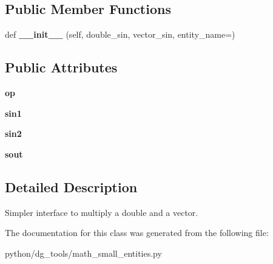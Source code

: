 \subsection*{Public Member Functions}
\begin{DoxyCompactItemize}
\item 
def {\bfseries \+\_\+\+\_\+init\+\_\+\+\_\+} (self, double\+\_\+sin, vector\+\_\+sin, entity\+\_\+name=\textquotesingle{}\textquotesingle{})\hypertarget{classpython_1_1dg__tools_1_1math__small__entities_1_1MultiplyDoubleVector_a686fa93d5e4eb5715a0e945b7f74eebd}{}\label{classpython_1_1dg__tools_1_1math__small__entities_1_1MultiplyDoubleVector_a686fa93d5e4eb5715a0e945b7f74eebd}

\end{DoxyCompactItemize}
\subsection*{Public Attributes}
\begin{DoxyCompactItemize}
\item 
{\bfseries op}\hypertarget{classpython_1_1dg__tools_1_1math__small__entities_1_1MultiplyDoubleVector_a457e6937d9762373d4e1442ef0f8063a}{}\label{classpython_1_1dg__tools_1_1math__small__entities_1_1MultiplyDoubleVector_a457e6937d9762373d4e1442ef0f8063a}

\item 
{\bfseries sin1}\hypertarget{classpython_1_1dg__tools_1_1math__small__entities_1_1MultiplyDoubleVector_ab9af832a8c134bf03fca80168dbe757b}{}\label{classpython_1_1dg__tools_1_1math__small__entities_1_1MultiplyDoubleVector_ab9af832a8c134bf03fca80168dbe757b}

\item 
{\bfseries sin2}\hypertarget{classpython_1_1dg__tools_1_1math__small__entities_1_1MultiplyDoubleVector_aed7cf50295ab6be0381522a8bbd7a637}{}\label{classpython_1_1dg__tools_1_1math__small__entities_1_1MultiplyDoubleVector_aed7cf50295ab6be0381522a8bbd7a637}

\item 
{\bfseries sout}\hypertarget{classpython_1_1dg__tools_1_1math__small__entities_1_1MultiplyDoubleVector_ac06f0ebb1bbda12565e5d33bb634cee2}{}\label{classpython_1_1dg__tools_1_1math__small__entities_1_1MultiplyDoubleVector_ac06f0ebb1bbda12565e5d33bb634cee2}

\end{DoxyCompactItemize}


\subsection{Detailed Description}
Simpler interface to multiply a double and a vector. 

The documentation for this class was generated from the following file\+:\begin{DoxyCompactItemize}
\item 
python/dg\+\_\+tools/math\+\_\+small\+\_\+entities.\+py\end{DoxyCompactItemize}
